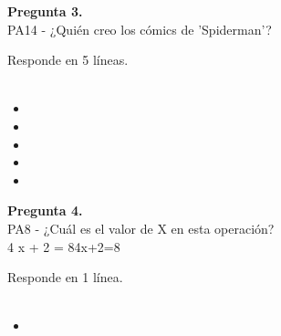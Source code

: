\documentclass[12pt,a4paper,twoside]{article}
\begin{document}
            \noindent\parbox[t]{\textwidth}
                {
                    \textbf{Pregunta 3.} \\
                    {
                        PA14 - ¿Quién creo los cómics de 'Spiderman'?\\
                    }\par\noindent Responde en 5 líneas.\\
                \\
                }
                \begin{itemize}[left=1.5cm,label={}, itemsep=0.02em] 
                
                    \item
                
                    \item
                
                    \item
                
                    \item
                
                    \item
                
                \end{itemize}
        
            \noindent\parbox[t]{\textwidth}
                {
                    \textbf{Pregunta 4.} \\
                    {
                        PA8 - ¿Cuál es el valor de X en esta operación?\\﻿4 x + 2 = 84x+2=8﻿\\
                    }\par\noindent Responde en 1 línea.\\
                \\
                }
                \begin{itemize}[left=1.5cm,label={}, itemsep=0.02em] 
                
                    \item
                
                \end{itemize}
        
\end{document}
